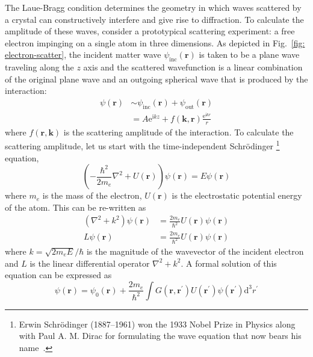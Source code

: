 The Laue-Bragg condition determines the geometry
in which waves scattered by a crystal can constructively interfere
and give rise to diffraction.
To calculate the amplitude of these waves,
consider a prototypical scattering experiment:
a free electron impinging on a single atom in three dimensions.
As depicted in Fig.~\ref{fig: electron-scatter},
the incident matter wave $\psi_{\text{inc}}(\boldsymbol{r})$
is taken to be a plane wave traveling along the $z$ axis and
the scattered wavefunction is a linear combination of the original plane wave and
an outgoing spherical wave that is produced by the interaction:
%
\begin{equation}
  \begin{aligned}
    \psi(\boldsymbol{r}) & \sim \psi_{\text{inc}}(\boldsymbol{r}) + \psi_{\text{out}}(\boldsymbol{r}) \\
      & = A \text{e}^{\text{i} k z} + f(\boldsymbol{k}, \boldsymbol{r}) \frac{\text{e}^{\text{i} k r}}{r}
    \label{eq: sc1}
  \end{aligned}
\end{equation}
%
where $f(\boldsymbol{r}, \boldsymbol{k})$ is the scattering amplitude of the interaction.
%
To calculate the scattering amplitude, let us start with the time-independent Schr\"{o}dinger%
\footnote{Erwin Schr\"{o}dinger (1887--1961) won the 1933 Nobel Prize in Physics
along with Paul A. M. Dirac for formulating the wave equation
that now bears his name~\cite{Nobel1901}.} equation,
%
\begin{equation}
  \left( -\frac{\hbar^2}{2 m_e} \nabla^2 + U(\boldsymbol{r}) \right) \psi(\boldsymbol{r}) = E \psi(\boldsymbol{r})
\end{equation}
%
where $m_e$ is the mass of the electron, $U(\boldsymbol{r})$ is the electrostatic potential energy of the atom.
This can be re-written as
%
\begin{equation}
\begin{aligned}
  \left( \nabla^2 + k^2 \right) \psi(\boldsymbol{r}) & = \frac{2 m_e}{\hbar^2} U(\boldsymbol{r}) \psi(\boldsymbol{r}) \\
  L \psi(\boldsymbol{r}) & = \frac{2 m_e}{\hbar^2} U(\boldsymbol{r}) \psi(\boldsymbol{r})
\end{aligned}
\end{equation}
%
where $k = \sqrt{2 m_e E}/\hbar$ is the magnitude of the wavevector of the incident electron and
$L$ is the linear differential operator $\nabla^2 + k^2$.
A formal solution of this equation can be expressed as
%
\begin{equation}
  \psi(\boldsymbol{r}) = \psi_0(\boldsymbol{r}) + \frac{2 m_e}{\hbar^2} \int G(\boldsymbol{r}, \boldsymbol{r}^\prime) U(\boldsymbol{r}^\prime) \psi(\boldsymbol{r}^\prime) \mathrm{d}^3 r^\prime
  \label{eq: formal}
\end{equation}

